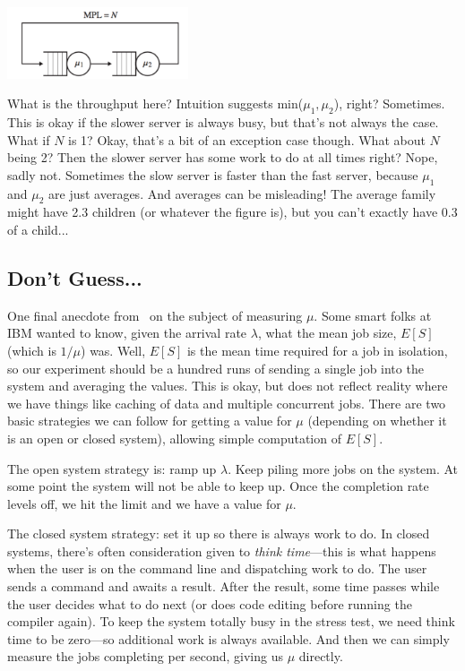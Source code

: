 \documentclass[a4paper]{report}
\begin{document}
\begin{center}
	\includegraphics[width=0.4\textwidth]{images/tandem-closed.png}
\end{center}

What is the throughput here? Intuition suggests min($\mu_{1}, \mu_{2}$), right? Sometimes. This is okay if the slower server is always busy, but that's not always the case. What if $N$ is 1? Okay, that's a bit of an exception case though. What about $N$ being 2? Then the slower server has some work to do at all times right? Nope, sadly not. Sometimes the slow server is faster than the fast server, because $\mu_{1}$ and $\mu_{2}$ are just averages. And averages can be misleading! The average family might have 2.3 children (or whatever the figure is), but you can't exactly have 0.3 of a child...

\subsection*{Don't Guess...}
One final anecdote from~\cite{pmd} on the subject of measuring $\mu$. Some smart folks at IBM wanted to know, given the arrival rate $\lambda$, what the mean job size, $E[S]$ (which is $1/\mu$) was. Well, $E[S]$ is the mean time required for a job in isolation, so our experiment should be a hundred runs of sending a single job into the system and averaging the values. This is okay, but does not reflect reality where we have things like caching of data and multiple concurrent jobs. There are two basic strategies we can follow for getting a value for $\mu$ (depending on whether it is an open or closed system), allowing simple computation of $E[S]$.

The open system strategy is: ramp up $\lambda$. Keep piling more jobs on the system. At some point the system will not be able to keep up. Once the completion rate levels off, we hit the limit and we have a value for $\mu$.

The closed system strategy: set it up so there is always work to do. In closed systems, there's often consideration given to \textit{think time}---this is what happens when the user is on the command line and dispatching work to do. The user sends a command and awaits a result. After the result, some time passes while the user decides what to do next (or does code editing before running the compiler again). To keep the system totally busy in the stress test, we need think time to be zero---so additional work is always available. And then we can simply measure the jobs completing per second, giving us $\mu$ directly.
\end{document}
